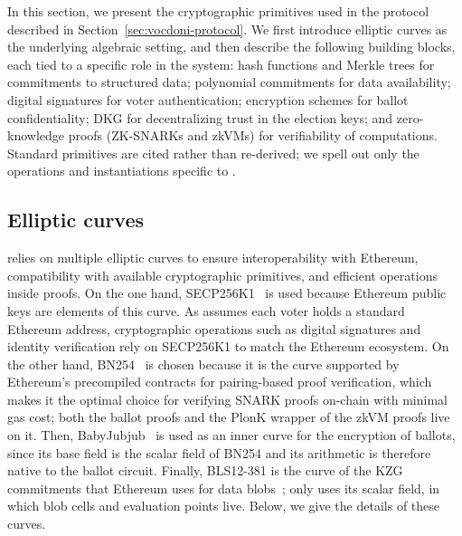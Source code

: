 %

In this section, we present the cryptographic primitives used in the protocol described in Section~\ref{sec:vocdoni-protocol}. We first introduce elliptic curves as the underlying algebraic setting, and then describe the following building blocks, each tied to a specific role in the system: hash functions and Merkle trees for commitments to structured data; polynomial commitments for data availability; digital signatures for voter authentication; encryption schemes for ballot confidentiality; \ac{DKG} for decentralizing trust in the election keys; and zero-knowledge proofs (\acp{ZK-SNARK} and \acp{zkVM}) for verifiability of computations. Standard primitives are cited rather than re-derived; we spell out only the operations and instantiations specific to \davinci.

\subsection{Elliptic curves}
\label{sec:cryptographic-primitives:elliptic-curves}

\Davinci relies on multiple elliptic curves to ensure interoperability with Ethereum, compatibility with available cryptographic primitives, and efficient operations inside proofs. On the one hand, SECP256K1~\cite{brown2010sec} is used because Ethereum public keys are elements of this curve. As \Davinci assumes each voter holds a standard Ethereum address, cryptographic operations such as digital signatures and identity verification rely on SECP256K1 to match the Ethereum ecosystem. On the other hand, BN254~\cite{wood2014ethereum} is chosen because it is the curve supported by Ethereum's precompiled contracts for pairing-based proof verification, which makes it the optimal choice for verifying SNARK proofs on-chain with minimal gas cost; both the ballot proofs and the PlonK wrapper of the \ac{zkVM} proofs live on it. Then, BabyJubjub~\cite{belles2021twisted} is used as an inner curve for the encryption of ballots, since its base field is the scalar field of BN254 and its arithmetic is therefore native to the ballot circuit. Finally, BLS12-381 is the curve of the \ac{KZG} commitments that Ethereum uses for data blobs~\cite{eip4844}; \davinci only uses its scalar field, in which blob cells and evaluation points live. Below, we give the details of these curves.

